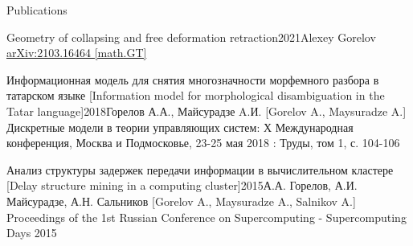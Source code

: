 \documentclass{resume}
\begin{document}
\begin{rSection}{Publications}
  \begin{rSubsection}{Geometry of collapsing and free deformation retraction}{2021}{Alexey Gorelov}{}
    \href{https://arxiv.org/abs/2103.16464}{arXiv:2103.16464 [math.GT]}
  \end{rSubsection}

  \begin{rSubsection}{Информационная модель для снятия многозначности морфемного разбора в татарском
      языке [Information model for morphological disambiguation in the Tatar
      language]}{2018}{Горелов А.А., Майсурадзе A.И. [Gorelov A., Maysuradze A.]}
    Дискретные модели в теории управляющих систем: Х Международная конференция, Москва и Подмосковье,
    23-25 мая 2018 : Труды, том 1, с. 104-106
  \end{rSubsection}

  \begin{rSubsection}{Анализ структуры задержек передачи информации в вычислительном кластере
      [Delay
      structure mining in a computing cluster]}{2015}{А.А. Горелов, А.И. Майсурадзе, А.Н. Сальников [Gorelov A., Maysuradze A., Salnikov A.]}{}
    Proceedings of the 1st Russian Conference on Supercomputing - Supercomputing Days 2015
  \end{rSubsection}
\end{rSection}
\end{document}
